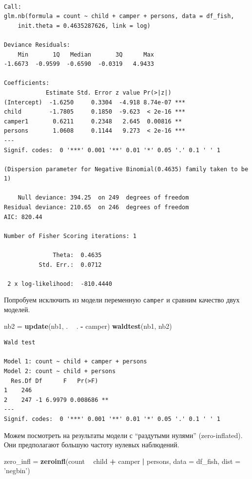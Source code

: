 \documentclass[]{book}
\newenvironment{Shaded}{\begin{snugshade}}{\end{snugshade}}
\newcommand{\DataTypeTok}[1]{\textcolor[rgb]{0.13,0.29,0.53}{#1}}
\newcommand{\KeywordTok}[1]{\textcolor[rgb]{0.13,0.29,0.53}{\textbf{#1}}}
\newcommand{\NormalTok}[1]{#1}
\newcommand{\OperatorTok}[1]{\textcolor[rgb]{0.81,0.36,0.00}{\textbf{#1}}}
\newcommand{\StringTok}[1]{\textcolor[rgb]{0.31,0.60,0.02}{#1}}
\begin{document}
\begin{verbatim}

Call:
glm.nb(formula = count ~ child + camper + persons, data = df_fish, 
    init.theta = 0.4635287626, link = log)

Deviance Residuals: 
    Min       1Q   Median       3Q      Max  
-1.6673  -0.9599  -0.6590  -0.0319   4.9433  

Coefficients:
            Estimate Std. Error z value Pr(>|z|)    
(Intercept)  -1.6250     0.3304  -4.918 8.74e-07 ***
child        -1.7805     0.1850  -9.623  < 2e-16 ***
camper1       0.6211     0.2348   2.645  0.00816 ** 
persons       1.0608     0.1144   9.273  < 2e-16 ***
---
Signif. codes:  0 '***' 0.001 '**' 0.01 '*' 0.05 '.' 0.1 ' ' 1

(Dispersion parameter for Negative Binomial(0.4635) family taken to be 1)

    Null deviance: 394.25  on 249  degrees of freedom
Residual deviance: 210.65  on 246  degrees of freedom
AIC: 820.44

Number of Fisher Scoring iterations: 1

              Theta:  0.4635 
          Std. Err.:  0.0712 

 2 x log-likelihood:  -810.4440 
\end{verbatim}

Попробуем исключить из модели переменную \texttt{camper} и сравним качество двух моделей.

\begin{Shaded}
\begin{Highlighting}[]
\NormalTok{nb2 =}\StringTok{ }\KeywordTok{update}\NormalTok{(nb1, . }\OperatorTok{~}\StringTok{ }\NormalTok{. }\OperatorTok{-}\StringTok{ }\NormalTok{camper)}
\KeywordTok{waldtest}\NormalTok{(nb1, nb2)}
\end{Highlighting}
\end{Shaded}

\begin{verbatim}
Wald test

Model 1: count ~ child + camper + persons
Model 2: count ~ child + persons
  Res.Df Df      F   Pr(>F)   
1    246                      
2    247 -1 6.9979 0.008686 **
---
Signif. codes:  0 '***' 0.001 '**' 0.01 '*' 0.05 '.' 0.1 ' ' 1
\end{verbatim}

Можем посмотреть на результаты модели с ``раздутыми нулями'' (zero-inflated). Они предполагают большую частоту нулевых наблюдений.

\begin{Shaded}
\begin{Highlighting}[]
\NormalTok{zero_infl =}\StringTok{ }\KeywordTok{zeroinfl}\NormalTok{(count }\OperatorTok{~}\StringTok{  }\NormalTok{child }\OperatorTok{+}\StringTok{ }\NormalTok{camper }\OperatorTok{|}\StringTok{ }\NormalTok{persons, }\DataTypeTok{data =}\NormalTok{ df_fish, }\DataTypeTok{dist =} \StringTok{'negbin'}\NormalTok{)}
\end{Highlighting}
\end{Shaded}
\end{document}

